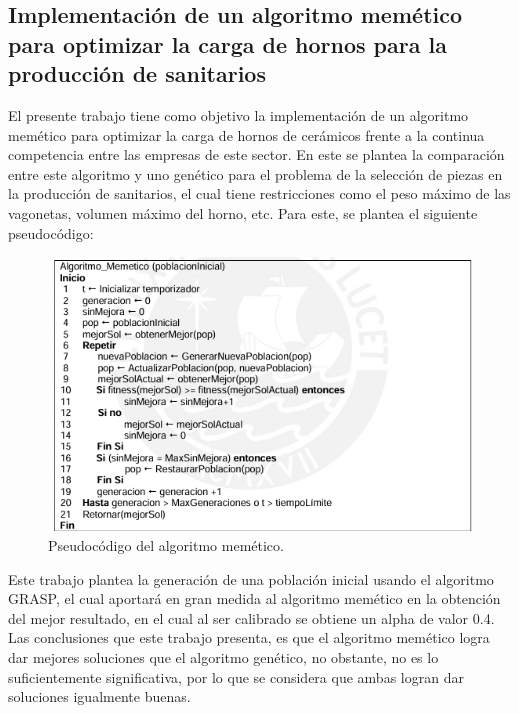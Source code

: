 \documentclass{article}
\begin{document}
\subsection{Implementación de un algoritmo memético para optimizar la carga de hornos para la producción de sanitarios}
El presente trabajo tiene como objetivo la implementación de un algoritmo memético para optimizar la carga de hornos de cerámicos frente a la continua competencia entre las empresas de este sector.  En este se plantea la comparación entre este algoritmo y uno genético para el problema de la selección de piezas en la producción de sanitarios, el cual tiene restricciones como el peso máximo de las vagonetas, volumen máximo del horno, etc. \newline
Para este, se plantea el siguiente pseudocódigo: \newline
\begin{figure}[H]
    \centering
    \includegraphics[width=1\linewidth]{imagenes/image4.png}
    \caption{Pseudocódigo del algoritmo memético.}
    \label{fig:enter-label}
\end{figure}
Este trabajo plantea la generación de una población inicial usando el algoritmo GRASP, el cual aportará en gran medida al algoritmo memético en la obtención del mejor resultado, en el cual al ser calibrado se obtiene un alpha de valor 0.4.
Las conclusiones que este trabajo presenta, es que el algoritmo memético logra dar mejores soluciones que el algoritmo genético, no obstante, no es lo suficientemente significativa, por lo que se considera que ambas logran dar soluciones igualmente buenas.
\end{document}
